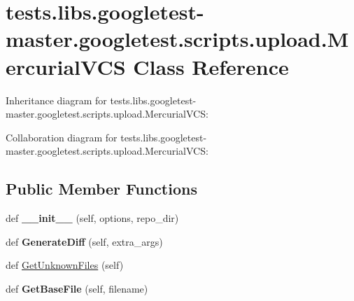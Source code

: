 \hypertarget{classtests_1_1libs_1_1googletest-master_1_1googletest_1_1scripts_1_1upload_1_1MercurialVCS}{}\section{tests.\+libs.\+googletest-\/master.googletest.\+scripts.\+upload.\+Mercurial\+V\+CS Class Reference}
\label{classtests_1_1libs_1_1googletest-master_1_1googletest_1_1scripts_1_1upload_1_1MercurialVCS}


Inheritance diagram for tests.\+libs.\+googletest-\/master.googletest.\+scripts.\+upload.\+Mercurial\+V\+CS\+:


Collaboration diagram for tests.\+libs.\+googletest-\/master.googletest.\+scripts.\+upload.\+Mercurial\+V\+CS\+:
\subsection*{Public Member Functions}
\begin{DoxyCompactItemize}
\item 
\mbox{\label{classtests_1_1libs_1_1googletest-master_1_1googletest_1_1scripts_1_1upload_1_1MercurialVCS_a005d6da1fba5368794bdf4546a9ab756}} 
def {\bfseries \+\_\+\+\_\+init\+\_\+\+\_\+} (self, options, repo\+\_\+dir)
\item 
\mbox{\label{classtests_1_1libs_1_1googletest-master_1_1googletest_1_1scripts_1_1upload_1_1MercurialVCS_aac7b7ccd0305fb8bf4d36d910552ebb4}} 
def {\bfseries Generate\+Diff} (self, extra\+\_\+args)
\item 
def \hyperlink{classtests_1_1libs_1_1googletest-master_1_1googletest_1_1scripts_1_1upload_1_1MercurialVCS_aefee25630036f4eb0c0f2d7d72a00570}{Get\+Unknown\+Files} (self)
\item 
\mbox{\label{classtests_1_1libs_1_1googletest-master_1_1googletest_1_1scripts_1_1upload_1_1MercurialVCS_a41a3f4b0a4af22fae0a3c5c651b961c2}} 
def {\bfseries Get\+Base\+File} (self, filename)
\end{DoxyCompactItemize}
